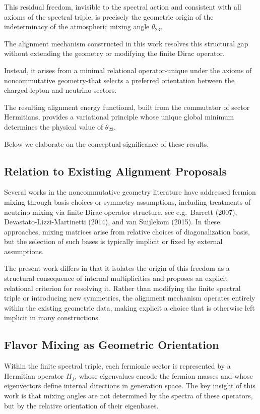 This residual freedom, invisible to the spectral action and consistent with all axioms of the spectral triple, is precisely the geometric origin of the indeterminacy of the atmospheric mixing angle $\theta_{23}$.

The alignment mechanism constructed in this work resolves this structural gap without extending the geometry or modifying the finite Dirac operator.

Instead, it arises from a minimal relational operator-unique under the axioms of noncommutative geometry-that selects a preferred orientation between the charged-lepton and neutrino sectors.

The resulting alignment energy functional, built from the commutator of sector Hermitians, provides a variational principle whose unique global minimum determines the physical value of $\theta_{23}$.

Below we elaborate on the conceptual significance of these results.

\subsection{Relation to Existing Alignment Proposals}

Several works in the noncommutative geometry literature have addressed fermion mixing through basis choices or symmetry assumptions, including treatments of neutrino mixing via finite Dirac operator structure, see e.g.\ Barrett (2007), Devastato-Lizzi-Martinetti (2014), and van Suijlekom (2015). In these approaches, mixing matrices arise from relative choices of diagonalization basis, but the selection of such bases is typically implicit or fixed by external assumptions.

The present work differs in that it isolates the origin of this freedom as a structural consequence of internal multiplicities and proposes an explicit relational criterion for resolving it. Rather than modifying the finite spectral triple or introducing new symmetries, the alignment mechanism operates entirely within the existing geometric data, making explicit a choice that is otherwise left implicit in many constructions.

\subsection{Flavor Mixing as Geometric Orientation}

Within the finite spectral triple, each fermionic sector is represented by a Hermitian operator $H_f$, whose eigenvalues encode the fermion masses and whose eigenvectors define internal directions in generation space. The key insight of this work is that mixing angles are not determined by the spectra of these operators, but by the relative orientation of their eigenbases.

